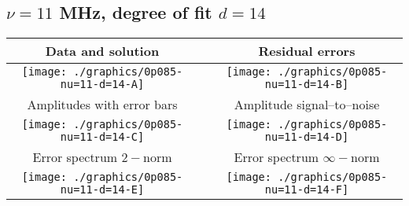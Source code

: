 

% 

\clearpage{}
\break{}

\subsection{$\nu = 11$ MHz, degree of fit $d = 14$}

\begin{table}[h]
    \begin{center}
        \begin{tabular}{ccc}
            Data and solution & \quad & Residual errors \\\hline
            \texttt{[image: ./graphics/0p085-nu=11-d=14-A]} &&
            \texttt{[image: ./graphics/0p085-nu=11-d=14-B]} \\[15pt]
            Amplitudes with error bars && Amplitude signal--to--noise \\\hline
            \texttt{[image: ./graphics/0p085-nu=11-d=14-C]} &&
            \texttt{[image: ./graphics/0p085-nu=11-d=14-D]} \\[15pt]
            Error spectrum $2-$norm && Error spectrum $\infty-$norm \\\hline
            \texttt{[image: ./graphics/0p085-nu=11-d=14-E]} &&
            \texttt{[image: ./graphics/0p085-nu=11-d=14-F]} \\[15pt]
        \end{tabular}
    \end{center}
\label{fig:elev=85, nu=11}
\end{table}



\endinput
